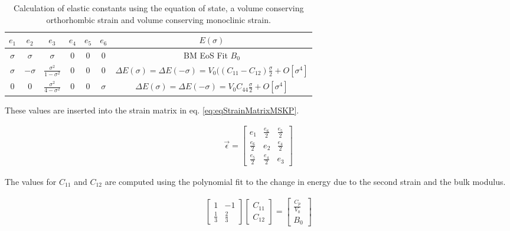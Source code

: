 \renewcommand{\arraystretch}{1.7}
\begin{table}[!htbp]
\centering
\begin{tabular}{c c c c c c c}
\hline\hline
$e_1$ & $e_2$ & $e_3$ & $e_4$ & $e_5$ & $e_6$ & $E(\sigma)$ \\
\hline\hline
$\sigma$ & $\sigma$ & $\sigma$ & 0 & 0 & 0 & BM EoS Fit $B_0$\\
$\sigma$ & $-\sigma$ & $\frac{\sigma^2}{1 - \sigma^2}$ & 0 & 0 & 0 & $\Delta E(\sigma) = \Delta E(-\sigma) = V_{0} ((C_{11} - C_{12}) \frac{\sigma}{2} + O[\sigma^4]$ \\
0 & 0 & $\frac{\sigma^2}{4 - \sigma^2}$ & 0 & 0 & $\sigma$ & $\Delta E(\sigma) = \Delta E(-\sigma) = V_{0} C_{44} \frac{\sigma}{2} + O[\sigma^4]$ \\
\end{tabular}
\label{tab:mskp1993}
\caption{Calculation of elastic constants using the equation of state, a volume conserving orthorhombic strain and volume conserving monoclinic strain.\cite{elasticpropertiesmehl}\cite{mehlsp}}
\end{table}

These values are inserted into the strain matrix in eq. \ref{eq:eqStrainMatrixMSKP}.

\begin{equation}
\begin{split}
\vec{\epsilon} = \begin{bmatrix} e_1 & \frac{e_6}{2} & \frac{e_5}{2} \\ \frac{e_6}{2} & e_2 & \frac{e_4}{2} \\ \frac{e_5}{2} & \frac{e_4}{2} & e_3 \end{bmatrix}
\end{split}
\label{eq:eqStrainMatrixMSKP}
\end{equation}

The values for $C_{11}$ and $C_{12}$ are computed using the polynomial fit to the change in energy due to the second strain and the bulk modulus.

\begin{equation}
\begin{split}
	\begin{bmatrix} 1 & -1 \\ \frac{1}{3} & \frac{2}{3} \end{bmatrix} \begin{bmatrix} C_{11} \\ C_{12} \end{bmatrix} = \begin{bmatrix} \frac{C_{p}}{V_0} \\ B_0 \end{bmatrix}
\end{split}
\label{eq:eqC11C12elastic}
\end{equation}


